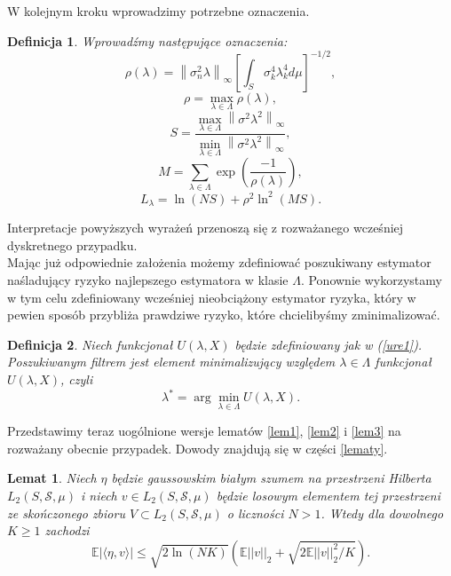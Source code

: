 \documentclass{article}
\newtheorem{df}{Definicja}
\newtheorem{lm}{Lemat}
\newcommand{\norm}[1]{\left\lVert#1\right\rVert}
\begin{document}
W kolejnym kroku wprowadzimy potrzebne oznaczenia.
\begin{df}
Wprowadźmy następujące oznaczenia:
\begin{displaymath}
\rho(\lambda)=\norm{\sigma_n^2\lambda}_{\infty}\left[\int_S\sigma_k^4\lambda_k^4d\mu\right]^{-1/2},
\end{displaymath}
\begin{displaymath}
\rho=\max_{\lambda\in \Lambda}\rho(\lambda),
\end{displaymath}
\begin{displaymath}
S=\frac{\max_{\lambda\in\Lambda}\norm{\sigma^2\lambda^2}_{\infty}}{\min_{\lambda\in \Lambda}\norm{\sigma^2\lambda^2}_{\infty}},
\end{displaymath}
\begin{displaymath}
M=\sum_{\lambda\in \Lambda}\exp\left(\frac{-1}{\rho(\lambda)}\right),
\end{displaymath}
\begin{displaymath}
L_{\lambda}=\ln(NS)+\rho^2\ln^2(MS).
\end{displaymath}
\end{df}
Interpretacje powyższych wyrażeń przenoszą się z rozważanego wcześniej dyskretnego przypadku.\\
Mając już odpowiednie założenia możemy zdefiniować poszukiwany estymator naśladujący ryzyko najlepszego estymatora w klasie $\Lambda$. Ponownie wykorzystamy w tym celu zdefiniowany wcześniej nieobciążony estymator ryzyka, który w pewien sposób przybliża prawdziwe ryzyko, które chcielibyśmy zminimalizować.
\begin{df}
Niech funkcjonał $U(\lambda,X)$ będzie zdefiniowany jak w (\ref{ure1}). Poszukiwanym filtrem jest element minimalizujący względem $\lambda\in \Lambda$ funkcjonał $U(\lambda,X)$, czyli
\begin{equation}\label{estimator1}
\lambda^*=\arg\min_{\lambda\in \Lambda}U(\lambda,X).
\end{equation}
\end{df}
Przedstawimy teraz uogólnione wersje lematów \ref{lem1}, \ref{lem2} i \ref{lem3} na rozważany obecnie przypadek. Dowody znajdują się w części \ref{lematy}.
\begin{lm}\label{lem4}
Niech $\eta$ będzie gaussowskim białym szumem na przestrzeni Hilberta $L_2(S,\mathcal{S},\mu)$ i niech $v\in L_2(S,\mathcal{S},\mu)$ będzie losowym elementem tej przestrzeni ze skończonego zbioru $V\subset L_2(S,\mathcal{S},\mu)$ o liczności $N>1$. Wtedy dla dowolnego $K\geq 1$ zachodzi
\begin{displaymath}
\mathbb{E}\left|\langle \eta, v\rangle\right|\leq \sqrt{2\ln (NK)}\left(\mathbb{E}||v||_2+\sqrt{2\mathbb{E}||v||_2^2/K}\right).
\end{displaymath}
\end{lm}
\end{document}
